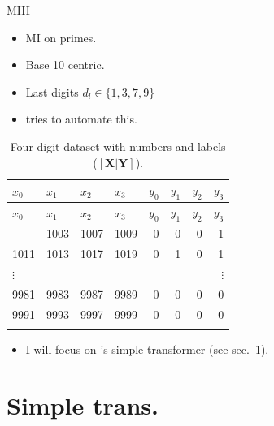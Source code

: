 \documentclass[aspectratio=32]{beamer}
\providecommand{\tightlist}{\setlength{\itemsep}{0pt}\setlength{\parskip}{0pt}}
\begin{document}
  \begin{frame}[allowframebreaks]{\textbar{} MIII}
  \begin{itemize}
  \tightlist
  \item
    MI on primes.
  \item
    Base 10 centric.
  \item
    Last digits \(d_l \in \{1,3,7,9\}\)
  \item
    \textcite{conmy2023} tries to automate this.
  \end{itemize}

  \framebreak

  \begin{longtable}[]{@{}llllrrrr@{}}
  \caption{Four digit dataset with numbers and labels
  (\([ \textbf{X} | \textbf{Y} ]\)).}\tabularnewline
  \toprule\noalign{}
  \(x_0\) & \(x_1\) & \(x_2\) & \(x_3\) & \(y_0\) & \(y_1\) & \(y_2\) &
  \(y_3\) \\
  \midrule\noalign{}
  \endfirsthead
  \toprule\noalign{}
  \(x_0\) & \(x_1\) & \(x_2\) & \(x_3\) & \(y_0\) & \(y_1\) & \(y_2\) &
  \(y_3\) \\
  \midrule\noalign{}
  \endhead
  1001 & 1003 & 1007 & 1009 & 0 & 0 & 0 & 1 \\
  1011 & 1013 & 1017 & 1019 & 0 & 1 & 0 & 1 \\
  \(\vdots\) & & & & & & & \(\vdots\) \\
  9981 & 9983 & 9987 & 9989 & 0 & 0 & 0 & 0 \\
  9991 & 9993 & 9997 & 9999 & 0 & 0 & 0 & 0 \\
  \bottomrule\noalign{}
  \end{longtable}

  \framebreak

  \begin{itemize}
  \tightlist
  \item
    I will focus on \textcite{he2023}'s simple transformer (see
    sec.~\ref{sec:simpletrans}).
  \end{itemize}
  \end{frame}

  \section{\texorpdfstring{\textbar{} Simple trans.
  \autocite{he2023}}{\textbar{} Simple trans. {[}@he2023{]}}}\label{sec:simpletrans}
\end{document}
